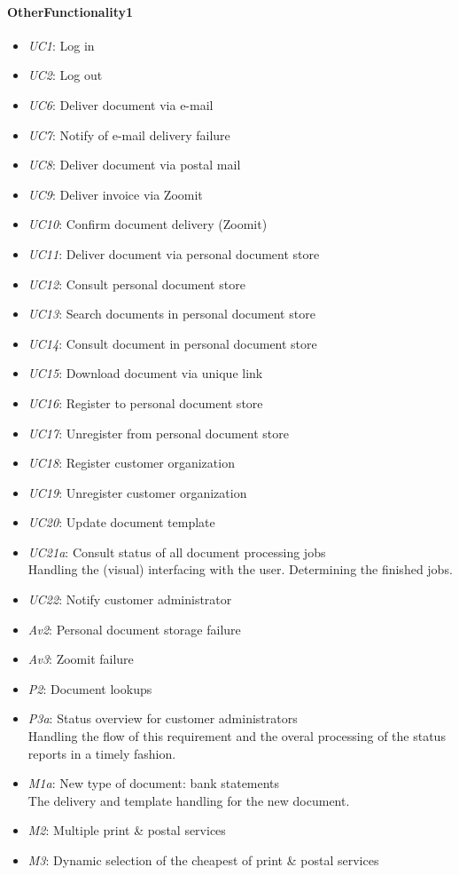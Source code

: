 \documentclass[a4paper,10pt]{article}
\begin{document}
\paragraph{OtherFunctionality1}
\begin{itemize}
    \item \emph{UC1}: Log in
    \item \emph{UC2}: Log out
    \item \emph{UC6}: Deliver document via e-mail
    \item \emph{UC7}: Notify of e-mail delivery failure
    \item \emph{UC8}: Deliver document via postal mail
    \item \emph{UC9}: Deliver invoice via Zoomit
    \item \emph{UC10}: Confirm document delivery (Zoomit)
    \item \emph{UC11}: Deliver document via personal document store
    \item \emph{UC12}: Consult personal document store
    \item \emph{UC13}: Search documents in personal document store
    \item \emph{UC14}: Consult document in personal document store
    \item \emph{UC15}: Download document via unique link
    \item \emph{UC16}: Register to personal document store
    \item \emph{UC17}: Unregister from personal document store
    \item \emph{UC18}: Register customer organization
    \item \emph{UC19}: Unregister customer organization
    \item \emph{UC20}: Update document template
    \item \emph{UC21a}: Consult status of all document processing jobs\\
    Handling the (visual) interfacing with the user. Determining the finished jobs.
    \item \emph{UC22}: Notify customer administrator
    \item \emph{Av2}: Personal document storage failure
    \item \emph{Av3}: Zoomit failure
    \item \emph{P2}: Document lookups
    \item \emph{P3a}: Status overview for customer administrators\\
    Handling the flow of this requirement and the overal processing of the status reports in a timely fashion.
    \item \emph{M1a}: New type of document: bank statements\\
    The delivery and template handling for the new document.
    \item \emph{M2}: Multiple print \& postal services
    \item \emph{M3}: Dynamic selection of the cheapest of print \& postal services
\end{itemize}
\end{document}
